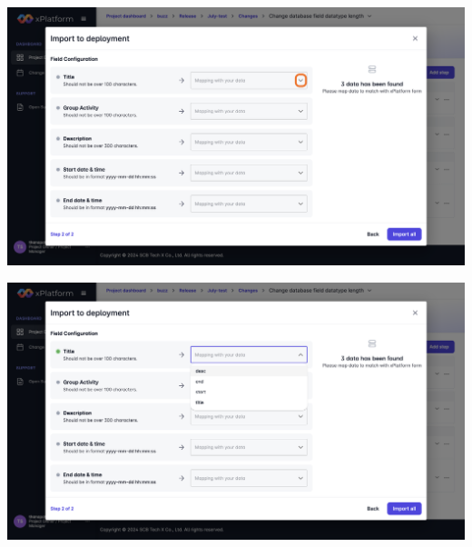 \begin{center}
    \includegraphics[width=\linewidth]{resources/pages/change-runbook/import-csv/35.png}

    \vspace{1in}

    \includegraphics[width=\linewidth]{resources/pages/change-runbook/import-csv/36.png}
\end{center}

